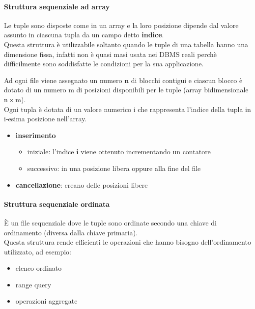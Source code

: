 \paragraph{Struttura sequenziale ad array}
Le tuple sono disposte come in un array e la loro posizione dipende dal valore assunto in ciascuna tupla da un campo detto \textbf{indice}.\\[0.2ex]
Questa struttura è utilizzabile soltanto quando le tuple di una tabella
hanno una dimensione fissa, infatti non è quasi masi usata nei DBMS reali perchè difficilmente sono soddisfatte le condizioni per la sua applicazione.

Ad ogni file viene assegnato un numero $\mathbf{n}$ di blocchi contigui e ciascun blocco è dotato di un numero $\mathrm{m}$ di posizioni disponibili per le tuple (array bidimensionale $\mathrm{n \times m}$).\\[0.2ex]
Ogni tupla è dotata di un valore numerico $\mathrm{i}$ che rappresenta l'indice della tupla in i-esima posizione nell'array.

\begin{itemize}[label=$\Rightarrow$, itemsep=\smallskipamount]
  \item \textbf{inserimento}
  \begin{itemize}[itemsep=\smallskipamount]
    \item iniziale: l’indice $\mathbf{i}$ viene ottenuto incrementando un contatore
    \item successivo: in una posizione libera oppure alla fine del file
  \end{itemize}
  \item \textbf{cancellazione}: creano delle posizioni libere
\end{itemize}

\paragraph{Struttura sequenziale ordinata}
È un file sequenziale dove le tuple sono ordinate secondo una chiave di ordinamento (diversa dalla chiave primaria).\\[0.2ex]
Questa struttura rende efficienti le operazioni che hanno bisogno
dell'ordinamento utilizzato, ad esempio:
\begin{itemize}[label=$\circ$, itemsep=\smallskipamount]
  \item elenco ordinato
  \item range query
  \item operazioni aggregate
\end{itemize}

